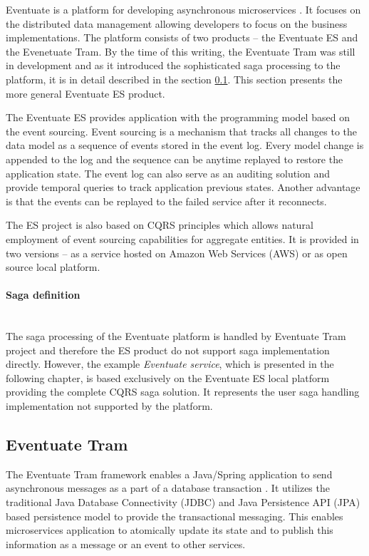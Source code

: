\documentclass[oneside,
  digital, %
  table,   %
  nolof,     %
  nolot,     %
]{fithesis3}
\newcommand{\newlinepar}[1]{\paragraph{#1}\needspace{4\baselineskip}\mbox{}\\}
\begin{document}
Eventuate is a platform for developing asynchronous microservices \cite{eventuate.io}. It focuses on the distributed data management allowing developers to focus on the business implementations. The platform consists of two products -- the Eventuate ES and the Evenetuate Tram. By the time of this writing, the Eventuate Tram was still in development and as it introduced the sophisticated saga processing to the platform, it is in detail described in the section \ref{sec:eventuate-tram}. This section presents the more general Eventuate ES product.

The Eventuate ES provides application with the programming model based on the event sourcing. Event sourcing is a mechanism that tracks all changes to the data model as a sequence of events stored in the event log. Every model change is appended to the log and the sequence can be anytime replayed to restore the application state. The event log can also serve as an auditing solution and provide temporal queries to track application previous states. Another advantage is that the events can be replayed to the failed service after it reconnects.


The ES project is also based on CQRS principles which allows natural employment of event sourcing capabilities for aggregate entities. It is provided in two versions -- as a service hosted on Amazon Web Services (AWS) or as open source local platform.

\newlinepar{Saga definition}

The saga processing of the Eventuate platform is handled by Eventuate Tram project and therefore the ES product do not support saga implementation directly. However, the example \textit{Eventuate service}, which is presented in the following chapter, is based exclusively on the Eventuate ES local platform providing the complete CQRS saga solution. It represents the user saga handling implementation not supported by the platform. 

\subsection{Eventuate Tram}
\label{sec:eventuate-tram}

The Eventuate Tram framework enables a Java/Spring application to send asynchronous messages as a part of a database transaction \cite{eventuate-tram}. It utilizes the traditional Java Database Connectivity (JDBC) and Java Persistence API (JPA) based persistence model to provide the transactional messaging. This enables microservices application to atomically update its state and to publish this information as a message or an event to other services.
\end{document}
